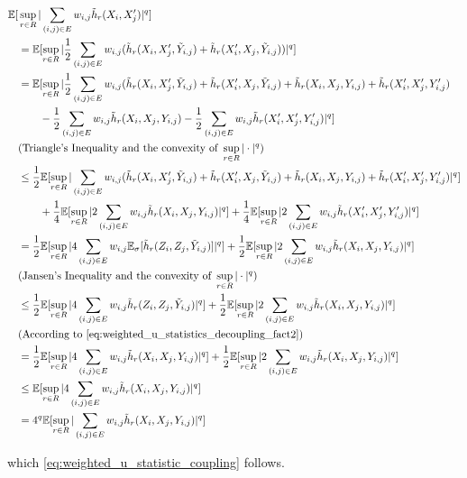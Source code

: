 \documentclass[letterpaper]{article} %
\def\SingleColumnEnd{}
\newcommand{\E}{\mathbb{E}}
\newcommand{\pair}[1]{(#1)}
\begin{document}
    \begin{align*}
        \E[&\sup_{r\in R} |\sum_{\pair{i,j}\in E}w_{i,j}\tilde{h}_r(X_i,X_j^\prime)|^q]\\
        &=\E[\sup_{r\in R} |\frac{1}{2}\sum_{\pair{i,j}\in E}w_{i,j}(\tilde{h}_r(X_i,X_j^\prime,\tilde{Y}_{i,j})+\tilde{h}_r(X_i^\prime,X_j,\tilde{Y}_{i,j}))|^q]\\
        &= \E[\sup_{r\in R} |\frac{1}{2}\sum_{\pair{i,j}\in E}w_{i,j}(\tilde{h}_r(X_i,X_j^\prime,\tilde{Y}_{i,j})+\tilde{h}_r(X_i^\prime,X_j,\tilde{Y}_{i,j})+\tilde{h}_r(X_i,X_j,Y_{i,j})+\tilde{h}_r(X_i^\prime,X_j^\prime,Y^\prime_{i,j})\\
        &\qquad-\frac{1}{2}\sum_{\pair{i,j}\in E}w_{i,j}\tilde{h}_r(X_i,X_j,Y_{i,j})-\frac{1}{2}\sum_{\pair{i,j}\in E}w_{i,j}\tilde{h}_r(X_i^\prime,X_j^\prime,Y^\prime_{i,j})|^q]\\
        &(\text{Triangle's Inequality and the convexity of }\sup_{r\in R}|\cdot|^q)\\
        &\le \frac{1}{2}\E[\sup_{r\in R} |\sum_{\pair{i,j}\in E}w_{i,j}(\tilde{h}_r(X_i,X_j^\prime,\tilde{Y}_{i,j})+\tilde{h}_r(X_i^\prime,X_j,\tilde{Y}_{i,j})+\tilde{h}_r(X_i,X_j,Y_{i,j})+\tilde{h}_r(X_i^\prime,X_j^\prime,Y^\prime_{i,j})|^q]\\
        &\qquad+\frac{1}{4}\E[\sup_{r\in R} |2\sum_{\pair{i,j}\in E}w_{i,j}\tilde{h}_r(X_i,X_j,Y_{i,j})|^q] + \frac{1}{4}\E[\sup_{r\in R} |2\sum_{\pair{i,j}\in E}w_{i,j}\tilde{h}_r(X_i^\prime,X_j^\prime,Y^\prime_{i,j})|^q]\\
        &= \frac{1}{2}\E[\sup_{r\in R} |4\sum_{\pair{i,j}\in E}w_{i,j}\E_\sigma[\tilde{h}_r(Z_i,Z_j,\tilde{Y}_{i,j})]|^q]+ \frac{1}{2}\E[\sup_{r\in R} |2\sum_{\pair{i,j}\in E}w_{i,j}\tilde{h}_r(X_i,X_j,Y_{i,j})|^q]\\
        &(\text{Jansen's Inequality and the convexity of }\sup_{r\in R}|\cdot|^q)\\
        &\le \frac{1}{2}\E[\sup_{r\in R} |4\sum_{\pair{i,j}\in E}w_{i,j}\tilde{h}_r(Z_i,Z_j,\tilde{Y}_{i,j})|^q] + \frac{1}{2}\E[\sup_{r\in R} |2\sum_{\pair{i,j}\in E}w_{i,j}\tilde{h}_r(X_i,X_j,Y_{i,j})|^q]\\
        &(\text{According to }\eqref{eq:weighted_u_statistics_decoupling_fact2})\\
        &= \frac{1}{2}\E[\sup_{r\in R} |4\sum_{\pair{i,j}\in E}w_{i,j}\tilde{h}_r(X_i,X_j,Y_{i,j})|^q] + \frac{1}{2}\E[\sup_{r\in R} |2\sum_{\pair{i,j}\in E}w_{i,j}\tilde{h}_r(X_i,X_j,Y_{i,j})|^q]\\
        &\le \E[\sup_{r\in R} |4\sum_{\pair{i,j}\in E}w_{i,j}\tilde{h}_r(X_i,X_j,Y_{i,j})|^q]\\
        &= 4^q\E[\sup_{r\in R} |\sum_{\pair{i,j}\in E}w_{i,j}\tilde{h}_r(X_i,X_j,Y_{i,j})|^q]
    \end{align*}
    \SingleColumnEnd
    which \eqref{eq:weighted_u_statistic_coupling} follows.
\end{document}
